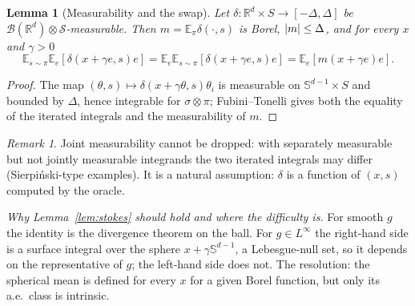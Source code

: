 \documentclass[11pt,a4paper]{article}
\numberwithin{equation}{section}
\newtheorem{lemma}[theorem]{Lemma}
\theoremstyle{definition}
\theoremstyle{remark}
\newtheorem{remark}[theorem]{Remark}
\newcommand{\E}{\mathbb E}\newcommand{\R}{\mathbb R}\newcommand{\N}{\mathbb N}\newcommand{\Prob}{\mathbb P}
\newcommand{\Sph}{\mathbb S^{d-1}}\newcommand{\Ball}{\mathbb B}
\begin{document}
\begin{lemma}[Measurability and the swap]\label{lem:fubini}
Let $\delta:\R^d\times S\to[-\Delta,\Delta]$ be $\mathcal B(\R^d)\otimes\mathcal S$-measurable. Then $m=\E_\pi\delta(\cdot,s)$ is Borel, $\lvert m\rvert\le\Delta$, and for \emph{every} $x$ and $\gamma>0$
\[\E_{s\sim\pi}\E_e[\delta(x+\gamma e,s)e]=\E_e\E_{s\sim\pi}[\delta(x+\gamma e,s)e]=\E_e[m(x+\gamma e)e].\]
\end{lemma}
\begin{proof}
The map $(\theta,s)\mapsto\delta(x+\gamma\theta,s)\theta_i$ is measurable on $\Sph\times S$ and bounded by $\Delta$, hence integrable for $\sigma\otimes\pi$; Fubini--Tonelli gives both the equality of the iterated integrals and the measurability of $m$.
\end{proof}
\begin{remark}
Joint measurability cannot be dropped: with separately measurable but not jointly measurable integrands the two iterated integrals may differ (Sierpiński-type examples). It is a natural assumption: $\delta$ is a function of $(x,s)$ computed by the oracle.
\end{remark}

\emph{Why Lemma~\ref{lem:stokes} should hold and where the difficulty is.} For smooth $g$ the identity is the divergence theorem on the ball. For $g\in L^\infty$ the right-hand side is a surface integral over the sphere $x+\gamma\Sph$, a Lebesgue-null set, so it depends on the representative of $g$; the left-hand side does not. The resolution: the spherical mean is defined for every $x$ for a given Borel function, but only its a.e.\ class is intrinsic.
\end{document}
